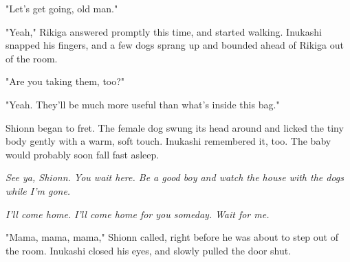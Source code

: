 "Let's get going, old man."

"Yeah," Rikiga answered promptly this time, and started walking.
Inukashi snapped his fingers, and a few dogs sprang up and bounded ahead
of Rikiga out of the room.

"Are you taking them, too?"

"Yeah. They'll be much more useful than what's inside this bag."

Shionn began to fret. The female dog swung its head around and licked
the tiny body gently with a warm, soft touch. Inukashi remembered it,
too. The baby would probably soon fall fast asleep.

\emph{See ya, Shionn. You wait here. Be a good boy and watch the house with
the dogs while I'm gone.}

\emph{I'll come home.}
\emph{I'll come home for you someday.}
\emph{Wait for me.}

"Mama, mama, mama," Shionn called, right before he was about to step out
of the room. Inukashi closed his eyes, and slowly pulled the door shut.